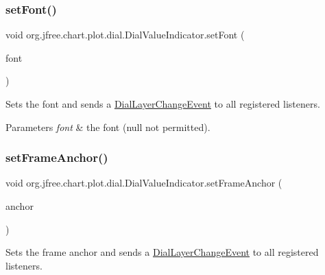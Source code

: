 \subsubsection{\texorpdfstring{set\+Font()}{setFont()}}
{\footnotesize\ttfamily void org.\+jfree.\+chart.\+plot.\+dial.\+Dial\+Value\+Indicator.\+set\+Font (\begin{DoxyParamCaption}\item[{Font}]{font }\end{DoxyParamCaption})}

Sets the font and sends a \mbox{\hyperlink{classorg_1_1jfree_1_1chart_1_1plot_1_1dial_1_1_dial_layer_change_event}{Dial\+Layer\+Change\+Event}} to all registered listeners.


\begin{DoxyParams}{Parameters}
{\em font} & the font ({\ttfamily null} not permitted). \\
\hline
\end{DoxyParams}
\mbox{\label{classorg_1_1jfree_1_1chart_1_1plot_1_1dial_1_1_dial_value_indicator_a88eb182999623eac46ffcfcdfea3a207}} 
\subsubsection{\texorpdfstring{set\+Frame\+Anchor()}{setFrameAnchor()}}
{\footnotesize\ttfamily void org.\+jfree.\+chart.\+plot.\+dial.\+Dial\+Value\+Indicator.\+set\+Frame\+Anchor (\begin{DoxyParamCaption}\item[{Rectangle\+Anchor}]{anchor }\end{DoxyParamCaption})}

Sets the frame anchor and sends a \mbox{\hyperlink{classorg_1_1jfree_1_1chart_1_1plot_1_1dial_1_1_dial_layer_change_event}{Dial\+Layer\+Change\+Event}} to all registered listeners.


